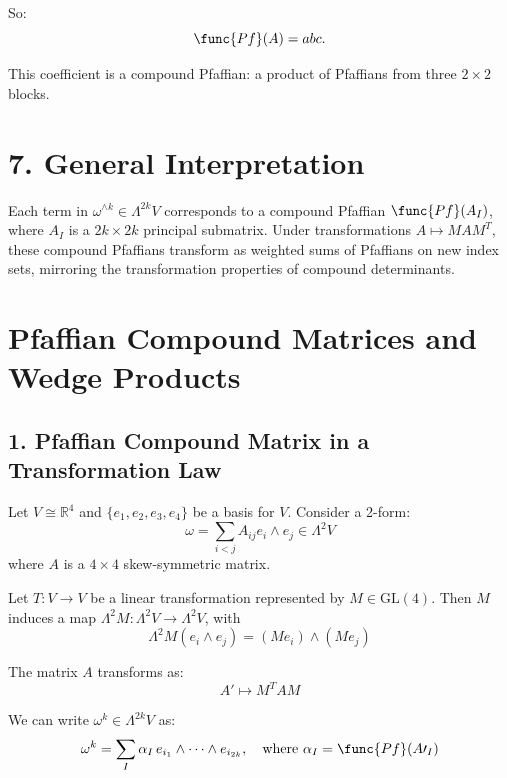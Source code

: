 \documentclass[aps,prd,onecolumn,notitlepage,nofootinbib]{revtex4-2}
\begin{document}
So: 
\begin{equation}
\func{Pf}(A) = abc.
\end{equation}

This coefficient is a compound Pfaffian: a product of Pfaffians from three $%
2 \times 2 $ blocks.

\section*{7. General Interpretation}

Each term in $\omega ^{\wedge k}\in \Lambda ^{2k}V$ corresponds to a
compound Pfaffian $\func{Pf}(A_{I})$, where $A_{I}$ is a $2k\times 2k$
principal submatrix. Under transformations $A\mapsto MAM^{T}$, these
compound Pfaffians transform as weighted sums of Pfaffians on new index
sets, mirroring the transformation properties of compound determinants.

\section*{Pfaffian Compound Matrices and Wedge Products}

\subsection*{1. Pfaffian Compound Matrix in a Transformation Law}

Let $V \cong \mathbb{R}^4$ and $\{e_1, e_2, e_3, e_4\}$ be a basis for $V$.
Consider a 2-form: 
\begin{equation}
\omega = \sum_{i<j} A_{ij} e_i \wedge e_j \in \Lambda^2 V
\end{equation}
where $A$ is a $4 \times 4$ skew-symmetric matrix.

Let $T:V\rightarrow V$ be a linear transformation represented by $M\in 
\mathrm{GL}(4)$. Then $M$ induces a map $\Lambda ^{2}M:\Lambda
^{2}V\rightarrow \Lambda ^{2}V$, with 
\begin{equation}
\Lambda ^{2}M(e_{i}\wedge e_{j})=(Me_{i})\wedge (Me_{j})
\end{equation}

The matrix $A$ transforms as: 
\begin{equation}
A\prime \mapsto M^{T}AM
\end{equation}

We can write $\omega ^{k}\in \Lambda ^{2k}V$ as: 
\begin{equation}
\omega ^{k}=\sum_{I}\alpha _{I}\,e_{i_{1}}\wedge \cdots \wedge
e_{i_{2k}},\quad \text{where }\alpha _{I}=\func{Pf}(A\prime _{I})
\end{equation}
\end{document}
